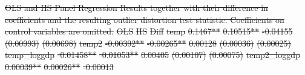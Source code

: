 \documentclass[11pt, letterpaper]{article}
\numberwithin{algorithm}{section}
\numberwithin{assumption}{section}
\numberwithin{lemma}{section}
\numberwithin{theorem}{section}
\numberwithin{corollary}{section}
\numberwithin{remark}{section}
\numberwithin{equation}{section}
\numberwithin{figure}{section}
\numberwithin{table}{section}
\providecommand{\DIFdel}[1]{{\protect\color{red}\sout{#1}}}                      %
\providecommand{\DIFdelbegin}{} %
\providecommand{\DIFdelFL}[1]{\DIFdel{#1}} %
\newcommand{\DIFscaledelfig}{0.5}
\newlength{\DIFdelgraphicswidth} %
\newlength{\DIFdelgraphicsheight} %
\newcommand{\DIFdelincludegraphics}[2][]{%
\sbox{\DIFdelgraphicsbox}{\DIFOincludegraphics[#1]{#2}}%
\settoboxwidth{\DIFdelgraphicswidth}{\DIFdelgraphicsbox} %
\settoboxtotalheight{\DIFdelgraphicsheight}{\DIFdelgraphicsbox} %
\scalebox{\DIFscaledelfig}{%
\parbox[b]{\DIFdelgraphicswidth}{\usebox{\DIFdelgraphicsbox}\\[-\baselineskip] \rule{\DIFdelgraphicswidth}{0em}}\llap{\resizebox{\DIFdelgraphicswidth}{\DIFdelgraphicsheight}{%
\setlength{\unitlength}{\DIFdelgraphicswidth}%
\begin{picture}(1,1)%
\thicklines\linethickness{2pt} %
{\color[rgb]{1,0,0}\put(0,0){\framebox(1,1){}}}%
{\color[rgb]{1,0,0}\put(0,0){\line( 1,1){1}}}%
{\color[rgb]{1,0,0}\put(0,1){\line(1,-1){1}}}%
\end{picture}%
}\hspace*{3pt}}} %
} %
\DeclareRobustCommand{\DIFdelbegin}{\DIFOdelbegin \let\includegraphics\DIFdelincludegraphics} %
\begin{document}
\DIFdelbegin %
{%
\DIFdelFL{OLS and IIS Panel Regression Results together with their difference in coefficients and the resulting outlier distortion test statistic. Coefficients on control variables are omitted.}}
\DIFdelFL{OLS }%
\DIFdelFL{IIS }%
\DIFdelFL{Diff }%
\DIFdelFL{temp }%
\DIFdelFL{0.1467** }%
\DIFdelFL{0.10515** }%
\DIFdelFL{-0.04155 }%
\DIFdelFL{(0.00993)}%
\DIFdelFL{(0.00698) }%
\DIFdelFL{temp2 }%
\DIFdelFL{-0.00392** }%
\DIFdelFL{-0.00265** }%
\DIFdelFL{0.00128 }%
\DIFdelFL{(0.00036) }%
\DIFdelFL{(0.00025) }%
\DIFdelFL{temp\_loggdp }%
\DIFdelFL{-0.01458** }%
\DIFdelFL{-0.01053** }%
\DIFdelFL{0.00405 }%
\DIFdelFL{(0.00107) }%
\DIFdelFL{(0.00075) }%
\DIFdelFL{temp2\_loggdp }%
\DIFdelFL{0.00039** }%
\DIFdelFL{0.00026** }%
\DIFdelFL{-0.00013 }%
\end{document}
